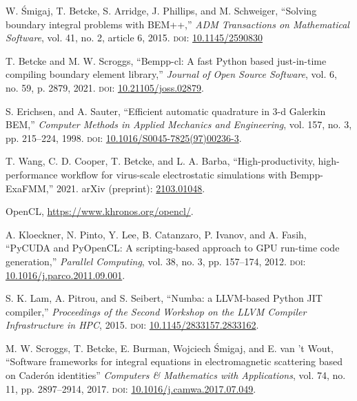\documentclass{IEEEcsmag}
\begin{document}

\begin{thebibliography}{1}

W. \'{S}migaj, T. Betcke, S. Arridge, J. Phillips, and M. Schweiger,
``Solving boundary integral problems with BEM++,''
{\it ADM Transactions on Mathematical Software}, vol. 41, no. 2, article 6, 2015.
\textsc{doi}: \href{https://doi.org/10.1145/2590830}{10.1145/2590830}

T. Betcke and M. W. Scroggs,
``Bempp-cl: A fast Python based just-in-time compiling boundary element library,''
{\it Journal of Open Source Software}, vol. 6, no. 59, p. 2879, 2021.
\textsc{doi}: \href{https://dx.doi.org/10.21105/joss.02879}{10.21105/joss.02879}.

S. Erichsen, and A. Sauter,
``Efficient automatic quadrature in 3-d Galerkin BEM,''
{\it Computer Methods in Applied Mechanics and Engineering}, vol. 157, no. 3, pp. 215--224, 1998.
\textsc{doi}: \href{https://doi.org/10.1016/S0045-7825(97)00236-3}{10.1016/S0045-7825(97)00236-3}.

T. Wang, C. D. Cooper, T. Betcke, and L. A. Barba,
``High-productivity, high-performance workflow for virus-scale electrostatic simulations with Bempp-ExaFMM,''
2021.
arXiv (preprint): \href{https://arxiv.org/abs/2103.01048}{2103.01048}.

OpenCL, \url{https://www.khronos.org/opencl/}.

A. Kloeckner, N. Pinto, Y. Lee, B. Catanzaro, P. Ivanov, and A. Fasih,
``PyCUDA and PyOpenCL: A scripting-based approach to GPU run-time code generation,''
{\it Parallel Computing}, vol. 38, no. 3, pp. 157--174, 2012.
\textsc{doi}: \href{https://dx.doi.org/10.1016/j.parco.2011.09.001}{10.1016/j.parco.2011.09.001}.

S. K. Lam, A. Pitrou, and S. Seibert,
``Numba: a LLVM-based Python JIT compiler,''
{\it Proceedings of the Second Workshop on the LLVM Compiler Infrastructure in HPC}, 2015.
\textsc{doi}: \href{https://dx.doi.org/10.1145/2833157.2833162}{10.1145/2833157.2833162}.

M. W. Scroggs, T. Betcke, E. Burman, Wojciech \'{S}migaj, and E. van 't Wout,
``Software frameworks for integral equations in electromagnetic scattering based on Cader\'{o}n identities''
{\it Computers \& Mathematics with Applications}, vol. 74, no. 11, pp. 2897--2914, 2017.
\textsc{doi}: \href{https://doi.org/10.1016/j.camwa.2017.07.049}{10.1016/j.camwa.2017.07.049}.

	
\end{thebibliography}
\end{document}
